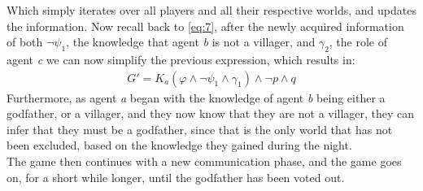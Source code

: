 Which simply iterates over all players and all their respective worlds, and
updates the information. Now recall back to \cref{eq:7}, after the newly
acquired information of both $\neg \psi_1$, the knowledge that agent \textit{b}
is not a villager, and $\gamma_2$, the role of agent \textit{c} we can now
simplify the previous expression, which results in:
\begin{align}
	G' = K_a(\varphi \land \neg \psi_1 \land \gamma_1) \land \neg p \land q
\end{align}
Furthermore, as agent \textit{a} began with the knowledge of agent \textit{b}
being either a godfather, or a villager, and they now know that they are not a
villager, they can infer that they must be a godfather, since that is the only
world that has not been excluded, based on the knowledge they gained during the
night. \\
The game then continues with a new communication phase, and the game goes on,
for a short while longer, until the godfather has been voted out.
